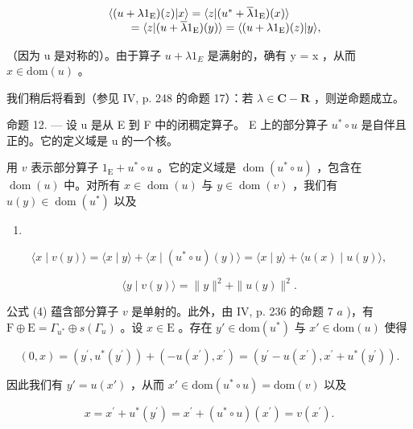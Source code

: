 \[
\begin{array}{r l} & {\langle (u + \lambda 1 _ {\mathrm{E}}) (z) | x \rangle = \langle z | (u ^ {*} + \overline {{\lambda}} 1 _ {\mathrm{E}}) (x) \rangle} \\ & {\qquad = \langle z | (u + \overline {{\lambda}} 1 _ {\mathrm{E}}) (y) \rangle = \langle (u + \lambda 1 _ {\mathrm{E}}) (z) | y \rangle ,} \end{array}
\]

（因为 u 是对称的）。由于算子 \(u + \lambda1_{E}\) 是满射的，确有 y = x ，从而 \(x \in \text{dom}(u)\) 。

我们稍后将看到（参见 IV, p. 248 的命题 17）：若 \(\lambda \in \mathbf{C} - \mathbf{R}\) ，则逆命题成立。

命题 12. --- 设 u 是从 E 到 F 中的闭稠定算子。 E 上的部分算子 \(u^{*}\circ u\) 是自伴且正的。它的定义域是 u 的一个核。

用 \(v\) 表示部分算子 \(1_{\mathrm{E}} + u^{*} \circ u\) 。它的定义域是 \(\operatorname{dom}(u^{*} \circ u)\) ，包含在 \(\operatorname{dom}(u)\) 中。对所有 \(x \in \operatorname{dom}(u)\) 与 \(y \in \operatorname{dom}(v)\) ，我们有 \(u(y) \in \operatorname{dom}(u^{*})\) 以及

\begin{enumerate}
\def\labelenumi{(\arabic{enumi})}
\setcounter{enumi}{2}
\tightlist
\item
\end{enumerate}

\[
\langle x \mid v (y) \rangle = \langle x \mid y \rangle + \langle x \mid (u ^ {*} \circ u) (y) \rangle = \langle x \mid y \rangle + \langle u (x) \mid u (y) \rangle ,\tag{4}
\]

\[
\langle y \mid v (y) \rangle = \| y \| ^ {2} + \| u (y) \| ^ {2}.
\]

公式 (4) 蕴含部分算子 \(v\) 是单射的。此外，由 IV, p. 236 的命题 7 \(a\) )，有 \(\mathrm{F} \oplus \mathrm{E} = \Gamma_{u^*} \oplus s(\Gamma_u)\) 。设 \(x \in \mathrm{E}\) 。存在 \(y' \in \mathrm{dom}(u^*)\) 与 \(x' \in \mathrm{dom}(u)\) 使得

\[
(0, x) = (y ^ {\prime}, u ^ {*} (y ^ {\prime})) + (- u (x ^ {\prime}), x ^ {\prime}) = (y ^ {\prime} - u (x ^ {\prime}), x ^ {\prime} + u ^ {*} (y ^ {\prime})).
\]

因此我们有 \(y' = u(x')\) ，从而 \(x' \in \text{dom}(u^* \circ u) = \text{dom}(v)\) 以及

\[
x = x ^ {\prime} + u ^ {*} (y ^ {\prime}) = x ^ {\prime} + (u ^ {*} \circ u) (x ^ {\prime}) = v (x ^ {\prime}).
\]

